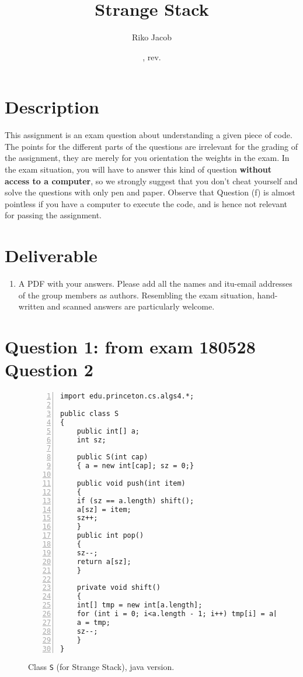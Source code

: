 \documentclass{tufte-handout}
\title{Strange Stack}
\author{Riko Jacob}
\date{\GITAuthorDate, rev. \GITAbrHash}
\begin{document}
\maketitle

\section{\textbf{Description}}
This assignment is an exam question about understanding a given piece of code.
The points for the different parts of the questions are irrelevant for the grading of the assignment, they are merely for you orientation the weights in the exam.
In the exam situation, you will have to answer this kind of question \textbf{without access to a computer}, so we strongly suggest that you don't cheat yourself and solve the questions with only pen and paper.
Observe that Question (f) is almost pointless if you have a computer to execute the code, and is hence not relevant for passing the assignment.

\section{\textbf{Deliverable}}
\begin{enumerate}
\item A PDF with your answers.
  Please add all the names and itu-email addresses of the group members as authors.
  Resembling the exam situation, hand-written and scanned answers are particularly welcome.
\end{enumerate}


\section{\textbf{Question 1}: from exam 180528 Question 2}
  \begin{figure}
    
    \begin{lstlisting}[basicstyle=\ttfamily,backgroundcolor=\color{white},
      frame=single,rulecolor=\color{gray!20},framesep=10pt,
      linewidth=12cm,numbers= left]
import edu.princeton.cs.algs4.*;

public class S
{
    public int[] a;
    int sz;

    public S(int cap)
    { a = new int[cap]; sz = 0;}

    public void push(int item)
    {
	if (sz == a.length) shift();
	a[sz] = item;
	sz++;
    }
    public int pop()
    {   
	sz--;
	return a[sz];
    }

    private void shift()
    {
	int[] tmp = new int[a.length];
	for (int i = 0; i<a.length - 1; i++) tmp[i] = a[i+1];
	a = tmp;
	sz--;
    }
}
    \end{lstlisting}
    \caption{\label{fig: S-java} Class {\tt S} (for Strange Stack), java version.}
  \end{figure}
\end{document}
